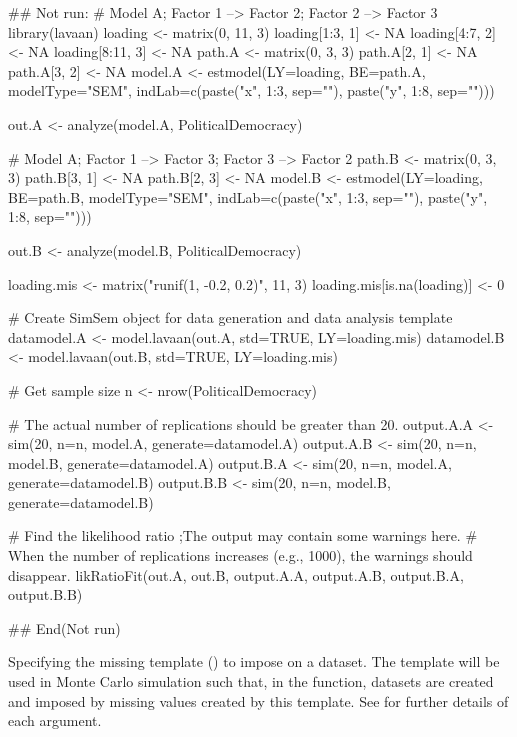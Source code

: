 \documentclass[a4paper]{book}
\begin{document}
%
\begin{Examples}
\begin{ExampleCode}
## Not run: 
# Model A; Factor 1 --> Factor 2; Factor 2 --> Factor 3
library(lavaan)
loading <- matrix(0, 11, 3)
loading[1:3, 1] <- NA
loading[4:7, 2] <- NA
loading[8:11, 3] <- NA
path.A <- matrix(0, 3, 3)
path.A[2, 1] <- NA
path.A[3, 2] <- NA
model.A <- estmodel(LY=loading, BE=path.A, modelType="SEM", indLab=c(paste("x", 1:3, sep=""), 
	paste("y", 1:8, sep="")))

out.A <- analyze(model.A, PoliticalDemocracy)

# Model A; Factor 1 --> Factor 3; Factor 3 --> Factor 2
path.B <- matrix(0, 3, 3)
path.B[3, 1] <- NA
path.B[2, 3] <- NA
model.B <- estmodel(LY=loading, BE=path.B, modelType="SEM", indLab=c(paste("x", 1:3, sep=""), 
	paste("y", 1:8, sep="")))

out.B <- analyze(model.B, PoliticalDemocracy)

loading.mis <- matrix("runif(1, -0.2, 0.2)", 11, 3)
loading.mis[is.na(loading)] <- 0

# Create SimSem object for data generation and data analysis template
datamodel.A <- model.lavaan(out.A, std=TRUE, LY=loading.mis)
datamodel.B <- model.lavaan(out.B, std=TRUE, LY=loading.mis)

# Get sample size
n <- nrow(PoliticalDemocracy)

# The actual number of replications should be greater than 20.
output.A.A <- sim(20, n=n, model.A, generate=datamodel.A) 
output.A.B <- sim(20, n=n, model.B, generate=datamodel.A)
output.B.A <- sim(20, n=n, model.A, generate=datamodel.B)
output.B.B <- sim(20, n=n, model.B, generate=datamodel.B)

# Find the likelihood ratio ;The output may contain some warnings here. 
# When the number of replications increases (e.g., 1000), the warnings should disappear.
likRatioFit(out.A, out.B, output.A.A, output.A.B, output.B.A, output.B.B)

## End(Not run)
\end{ExampleCode}
\end{Examples}
%
\begin{Description}\relax
Specifying the missing template () to impose on a dataset. The template will be used in Monte Carlo simulation such that, in the  function, datasets are created and imposed by missing values created by this template. See  for further details of each argument.
\end{Description}
\end{document}
